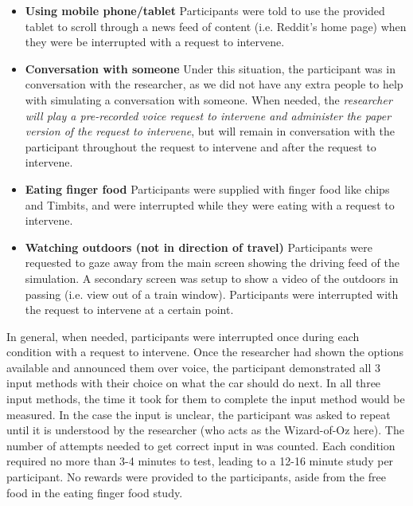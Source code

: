 \documentclass{sigchi}
\begin{document}
\begin{enumerate}
\begin{itemize}
\item \textbf{Using mobile phone/tablet}
\newline
Participants were told to use the provided tablet to scroll through a news feed of content (i.e. Reddit's home page) when they were be interrupted with a request to intervene.
\item \textbf{Conversation with someone}
\newline
Under this situation, the participant was in conversation with the researcher, as we did not have any extra people to help with simulating a conversation with someone. When needed, the \textit{researcher will play a pre-recorded  voice request to intervene and administer the paper version of the request to intervene}, but will remain in conversation with the participant throughout the request to intervene and after the request to intervene.
\item \textbf{Eating finger food}
\newline
Participants were supplied with finger food like chips and Timbits, and were interrupted while they were eating with a request to intervene.
\item \textbf{Watching outdoors (not in direction of travel)}
\newline
Participants were requested to gaze away from the main screen showing the driving feed of the simulation. A secondary screen was setup to show a video of the outdoors in passing (i.e. view out of a train window). Participants were interrupted with the request to intervene at a certain point.
\end{itemize}
\end{enumerate}
In general, when needed, participants were interrupted once during each condition with a request to intervene. Once the researcher had shown the options available and announced them over voice, the participant demonstrated all 3 input methods with their choice on what the car should do next. In all three input methods, the time it took for them to complete the input method would be measured. In the case the input is unclear, the participant was asked to repeat until it is understood by the researcher (who acts as the Wizard-of-Oz here). The number of attempts needed to get correct input in was counted. Each condition required no more than 3-4 minutes to test, leading to a 12-16 minute study per participant. No rewards were provided to the participants, aside from the free food in the eating finger food study.
\end{document}
